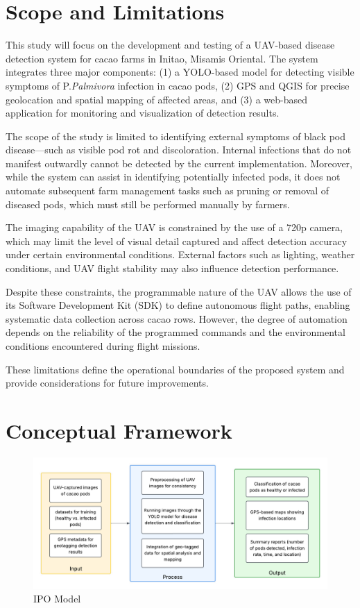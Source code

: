 {\section{Scope and Limitations}
This study will focus on the development and testing of a UAV-based disease detection system for cacao farms in Initao, Misamis Oriental. The system integrates three major components: (1) a YOLO-based model for detecting visible symptoms of P.\textit{Palmivora} infection in cacao pods, (2) GPS and QGIS for precise geolocation and spatial mapping of affected areas, and (3) a web-based application for monitoring and visualization of detection results.

The scope of the study is limited to identifying external symptoms of black pod disease—such as visible pod rot and discoloration. Internal infections that do not manifest outwardly cannot be detected by the current implementation. Moreover, while the system can assist in identifying potentially infected pods, it does not automate subsequent farm management tasks such as pruning or removal of diseased pods, which must still be performed manually by farmers.

The imaging capability of the UAV is constrained by the use of a 720p camera, which may limit the level of visual detail captured and affect detection accuracy under certain environmental conditions. External factors such as lighting, weather conditions, and UAV flight stability may also influence detection performance.

Despite these constraints, the programmable nature of the UAV allows the use of its Software Development Kit (SDK) to define autonomous flight paths, enabling systematic data collection across cacao rows. However, the degree of automation depends on the reliability of the programmed commands and the environmental conditions encountered during flight missions.

These limitations define the operational boundaries of the proposed system and provide considerations for future improvements.

\section{Conceptual Framework}

\begin{figure}[H]
	\centering
  \caption{IPO Model}
	\label{fig:ipo}
	\includegraphics[width=1\textwidth]{figures/IPO.pdf}
\end{figure}

}
